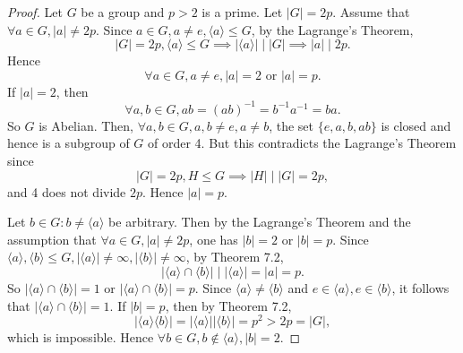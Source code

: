 \documentclass{article}
\theoremstyle{definition}
\begin{document}
     \begin{proof}
        Let $G$ be a group and $p>2$ is a prime. Let $|G|=2p$. Assume that $\forall a \in G, |a| \neq 2p$. Since $a \in G, a \neq e, \langle a \rangle \leq G$, by the Lagrange's Theorem, 
        \begin{equation*}
            |G|=2p, \langle a \rangle \leq G \implies |\langle a \rangle| \mid |G| \implies |a| \mid 2p.
        \end{equation*}
        Hence
        \begin{equation*}
            \forall a \in G, a \neq e, |a| = 2 \text{ or } |a| = p.
        \end{equation*}
        If $|a|=2$, then
        \begin{equation*}
            \forall a, b \in G, ab = (ab)^{-1} = b^{-1}a^{-1} = ba.
        \end{equation*}
        So $G$ is Abelian. Then, $\forall a, b \in G, a,b \neq e, a \neq b$, the set $\{e,a,b,ab\}$ is closed and hence is a subgroup of $G$ of order 4. But this contradicts the Lagrange's Theorem since
        \begin{equation*}
            |G|=2p, H \leq G \implies |H| \mid |G| = 2p,
        \end{equation*}
        and 4 does not divide $2p$. Hence $|a| = p$.
        
        Let $b \in G: b \neq \langle a \rangle$ be arbitrary. Then by the Lagrange's Theorem and the assumption that $\forall a \in G, |a| \neq 2p$, one has $|b|=2$ or $|b|=p$. Since $\langle a 
        \rangle, \langle b \rangle \leq G, |\langle a \rangle| \neq \infty, |\langle b \rangle| \neq \infty$, by Theorem 7.2, 
        \begin{equation*}
            |\langle a \rangle \cap \langle b \rangle| \mid |\langle a \rangle| = |a| = p.
        \end{equation*}
        So $|\langle a \rangle \cap \langle b \rangle| = 1$ or $|\langle a \rangle \cap \langle b \rangle| = p$. Since $\langle a \rangle \neq \langle b \rangle$ and $e \in \langle a \rangle, e \in \langle b \rangle$, it follows that $|\langle a \rangle \cap \langle b \rangle| = 1$. If $|b| = p$, then by Theorem 7.2,
        \begin{equation*}
            |\langle a \rangle \langle b \rangle| = |\langle a \rangle||\langle b \rangle| = p^2 > 2p = |G|,
        \end{equation*}
        which is impossible. Hence $\forall b \in G, b \notin \langle a \rangle, |b| = 2$.
        

\end{proof}
\end{document}
